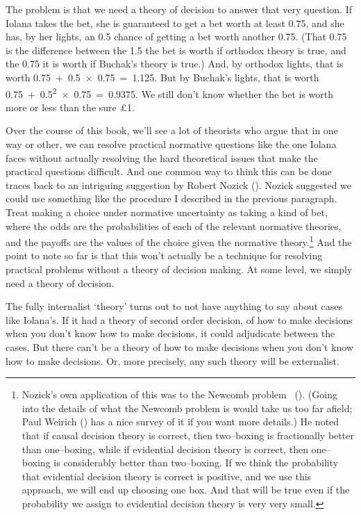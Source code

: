 \documentclass[
  10pt,
  letterpaper,
  twoside]{scrbook}
\begin{document}
The problem is that we need a theory of decision to answer that very
question. If {Iolana} takes the bet, she is guaranteed to get a bet
worth at least 0.75, and she has, by her lights, an 0.5 chance of
getting a bet worth another 0.75. (That 0.75 is the difference between
the 1.5 the bet is worth if orthodox theory is true, and the 0.75 it is
worth if Buchak's theory is true.) And, by orthodox lights, that is
worth 0.75~+~0.5~×~0.75~=~1.125. But by Buchak's lights, that is worth
0.75~+~0.5\textsuperscript{2}~×~0.75~=~0.9375. We still don't know
whether the bet is worth more or less than the sure £1.

Over the course of this book, we'll see a lot of theorists who argue
that in one way or other, we can resolve practical normative questions
like the one {Iolana} faces without actually resolving the hard
theoretical issues that make the practical questions difficult. And one
common way to think this can be done traces back to an intriguing
suggestion by Robert Nozick (). Nozick
suggested we could use something like the procedure I described in the
previous paragraph. Treat making a choice under normative uncertainty as
taking a kind of bet, where the odds are the probabilities of each of
the relevant normative theories, and the payoffs are the values of the
choice given the normative theory.\footnote{Nozick's own application of
  this was to the Newcomb problem ~(). (Going into the details of what the Newcomb problem is would
  take us too far afield; Paul Weirich
  () has a nice survey of it if you want
  more details.) He noted that if causal decision theory is correct,
  then two--boxing is fractionally better than one--boxing, while if
  evidential decision theory is correct, then one--boxing is
  considerably better than two--boxing. If we think the probability that
  evidential decision theory is correct is positive, and we use this
  approach, we will end up choosing one box. And that will be true even
  if the probability we assign to evidential decision theory is very
  very small.} And the point to note so far is that this won't actually
be a technique for resolving practical problems without a theory of
decision making. At some level, we simply need a theory of decision.

The fully internalist `theory' turns out to not have anything to say
about cases like {Iolana}'s. If it had a theory of second order
decision, of how to make decisions when you don't know how to make
decisions, it could adjudicate between the cases. But there can't be a
theory of how to make decisions when you don't know how to make
decisions. Or, more precisely, any such theory will be externalist.
\end{document}
